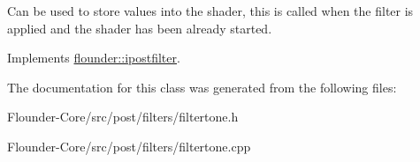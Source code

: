 Can be used to store values into the shader, this is called when the filter is applied and the shader has been already started. 



Implements \hyperlink{classflounder_1_1ipostfilter_a9b658b4672718d5ac36539875bde722e}{flounder\+::ipostfilter}.



The documentation for this class was generated from the following files\+:\begin{DoxyCompactItemize}
\item 
Flounder-\/\+Core/src/post/filters/filtertone.\+h\item 
Flounder-\/\+Core/src/post/filters/filtertone.\+cpp\end{DoxyCompactItemize}

